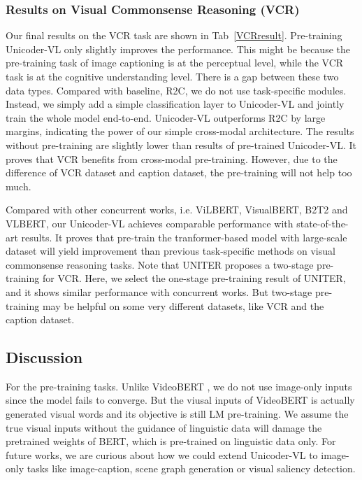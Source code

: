 \documentclass[letterpaper]{article} \usepackage{aaai20}  \usepackage{times}  \usepackage{helvet} \usepackage{courier}  \usepackage[hyphens]{url}  \usepackage{graphicx} \urlstyle{rm} \def\UrlFont{\rm}  \usepackage{graphicx}  \frenchspacing  \setlength{\pdfpagewidth}{8.5in}  \setlength{\pdfpageheight}{11in}  \usepackage{amssymb}
\begin{document}
\subsubsection{Results on Visual Commonsense Reasoning (VCR)}
Our final results on the VCR task are shown in
Tab~\ref{VCRresult}. Pre-training Unicoder-VL only slightly improves the performance. This might be because the pre-training task of image captioning is at the perceptual level, while the VCR task is at the cognitive understanding level. There is a gap between these two data types. Compared with baseline, R2C, we do not use task-specific modules. Instead, we simply add a simple classification layer to Unicoder-VL and jointly train the whole model end-to-end. Unicoder-VL outperforms R2C by large margins, indicating the power of our simple cross-modal architecture. 
The results without pre-training are slightly lower than results of pre-trained Unicoder-VL. It proves that VCR benefits from cross-modal pre-training. However, due to the difference of VCR dataset and caption dataset, the pre-training will not help too much.

Compared with other concurrent works, i.e. ViLBERT, VisualBERT, B2T2 and VLBERT,
our Unicoder-VL achieves comparable performance with state-of-the-art results. It proves that pre-train the tranformer-based model with large-scale dataset will yield improvement than previous task-specific methods on visual commonsense reasoning tasks. Note that UNITER proposes a two-stage pre-training for VCR. Here, we select the one-stage pre-training result of UNITER, and it shows similar performance with concurrent works. But two-stage pre-training may be helpful on some very different datasets, like VCR and the caption dataset.

\subsection{Discussion}  
For the pre-training tasks. Unlike VideoBERT \cite{sun2019videobert}, we do not use image-only inputs since the model fails to converge. But the viusal inputs of VideoBERT is actually generated visual words and its objective is still LM pre-training. We assume the true visual inputs without the guidance of linguistic data will damage the pretrained weights of BERT, which is pre-trained on linguistic data only. For future works, we are curious about how we could extend Unicoder-VL to image-only tasks like image-caption, scene graph generation or visual saliency detection.
\end{document}
